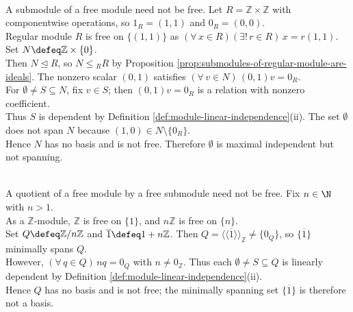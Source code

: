 \begin{counterexample} \label{cex:free-module-with-nonfree-submodule} \\
A submodule of a free module need not be free. Let $R=\mathbb{Z}\times\mathbb{Z}$ with componentwise operations, so $1_R=(1,1)$ and $0_R=(0,0)$.\\
Regular module $R$ is free on $\{(1,1)\}$ as $(\forall\,x\in R)(\exists!\,r\in R)\,x=r(1,1)$. Set $N\defeq\mathbb{Z}\times\{0\}$.\\
Then $N\trianglelefteq R$, so $N\leq{}_R R$ by Proposition \ref{prop:submodules-of-regular-module-are-ideals}. The nonzero scalar $(0,1)$ satisfies $(\forall\,v\in N)\,(0,1)v=0_R$.\\
For $\emptyset\neq S\subseteq N$, fix $v\in S$; then $(0,1)v=0_R$ is a relation with nonzero coefficient.\\
Thus $S$ is dependent by Definition \ref{def:module-linear-independence}(ii). The set $\emptyset$ does not span $N$ because $(1,0)\in N\setminus\{0_R\}$.\\
Hence $N$ has no basis and is not free. Therefore $\emptyset$ is maximal independent but not spanning.
\end{counterexample}

\begin{counterexample} \label{cex:quotient-free-module-need-not-free} \\
A quotient of a free module by a free submodule need not be free. Fix $n\in\N$ with $n>1$.\\
As a $\mathbb{Z}$-module, $\mathbb{Z}$ is free on $\{1\}$, and $n\mathbb{Z}$ is free on $\{n\}$.\\
Set $Q\defeq\mathbb{Z}/n\mathbb{Z}$ and $\overline{1}\defeq1+n\mathbb{Z}$. Then $Q=\langle\!\langle\overline{1}\rangle\!\rangle_{\mathbb{Z}}\neq\{0_Q\}$, so $\{\overline{1}\}$ minimally spans $Q$.\\
However, $(\forall\,q\in Q)\,nq=0_Q$ with $n\neq0_{\mathbb{Z}}$. Thus each $\emptyset\neq S\subseteq Q$ is linearly dependent by Definition \ref{def:module-linear-independence}(ii).\\
Hence $Q$ has no basis and is not free; the minimally spanning set $\{\overline{1}\}$ is therefore not a basis.
\end{counterexample}

